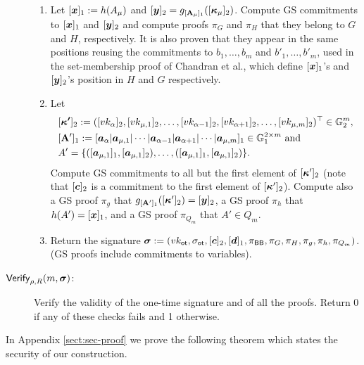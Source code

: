 \begin{description}
\begin{enumerate}
\item Let $[{\boldsymbol{x}}]_1:=h(A_\mu)$ and $[{\boldsymbol{y}}]_2=g_{[\mathbf{{A}}_\mu]_1}([{\boldsymbol{\kappa}}_\mu]_2)$. Compute GS commitments to $[{\boldsymbol{x}}]_1$ and $[{\boldsymbol{y}}]_2$ and compute proofs $\pi_G$ and $\pi_H$ that they belong to $G$ and $H$, respectively. It is also proven that they appear in the same positions reusing the commitments to $b_1,\ldots,b_{m}$ and $b'_1,\ldots,b'_{m}$, used in the set-membership proof of Chandran et al., which define $[{\boldsymbol{x}}]_1$'s and $[{\boldsymbol{y}}]_2$'s position in $H$ and $G$ respectively.

\item Let
\begin{align*}
&[{\boldsymbol{\kappa'}}]_2:=([vk_\alpha]_2,[vk_{\mu,1}]_2,\ldots,[vk_{\alpha-1}]_2,[vk_{\alpha+1}]_2,\ldots,[vk_{\mu,m}]_2)^\top\in\mathbb{G}^m_2,\\
&[\mathbf{{A}}']_1:=[{\boldsymbol{a}}_\alpha | {\boldsymbol{a}}_{\mu,1} | \cdots | {\boldsymbol{a}}_{\alpha-1}| {\boldsymbol{a}}_{\alpha+1}|\cdots|{\boldsymbol{a}}_{\mu,m}]_1\in\mathbb{G}^{2\times m}_1\text{ and}\\
&A'=\{([{\boldsymbol{a}}_{\mu,1}]_1,[{\boldsymbol{a}}_{\mu,1}]_2),\ldots,([{\boldsymbol{a}}_{\mu,1}]_1,[{\boldsymbol{a}}_{\mu,1}]_2)\}.
\end{align*}
Compute GS commitments to all but the first element of $[{\boldsymbol{\kappa}}']_2$ (note that $[{\boldsymbol{c}}]_2$ is a commitment to the first element of $[{\boldsymbol{\kappa}}']_2$). Compute also a GS proof $\pi_g$ that $g_{[\mathbf{{A}}']_1}([{\boldsymbol{\kappa}}']_2)=[{\boldsymbol{y}}]_2$, a GS proof $\pi_{h}$ that $h(A')=[{\boldsymbol{x}}]_1$, and a GS proof $\pi_{Q_m}$ that $A'\in Q_m$.

\item Return the signature ${\boldsymbol \sigma}:=(vk_\mathsf{ot},\sigma_\mathsf{ot},[{\boldsymbol{c}}]_2,[{\boldsymbol{d}}]_1,\pi_{\mathsf{BB}},\pi_G,\pi_H, \pi_g,\pi_h,\pi_{Q_m})$. (GS proofs include commitments to variables).
\end{enumerate}

\item[$\mathsf{Verify}_{\rho,R}(m,{\boldsymbol \sigma})$:] Verify the validity of the one-time signature and of all the proofs. Return 0 if any of these checks fails and 1 otherwise.
\end{description}

In Appendix \ref{sect:sec-proof} we prove the following theorem which states the security of our construction.

